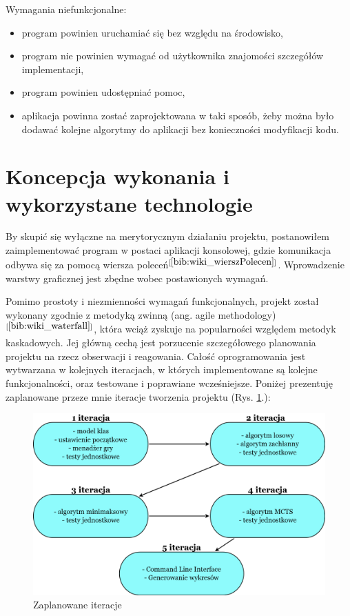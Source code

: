 Wymagania niefunkcjonalne:
\begin{itemize}
	\item program powinien uruchamiać się bez względu na środowisko,
	\item program nie powinien wymagać od użytkownika znajomości szczegółów implementacji,
	\item program powinien udostępniać pomoc,
	\item aplikacja powinna zostać zaprojektowana w taki sposób, żeby można było dodawać kolejne algorytmy do aplikacji bez konieczności modyfikacji kodu.
\end{itemize}
\clearpage
	
\section{Koncepcja wykonania i wykorzystane technologie}
By skupić się wyłączne na merytorycznym działaniu projektu, postanowiłem zaimplementować program w postaci aplikacji konsolowej, gdzie komunikacja odbywa się za pomocą wiersza poleceń$^{[\ref{bib:wiki_wierszPolecen}]}$. Wprowadzenie warstwy graficznej jest zbędne wobec postawionych wymagań.

Pomimo prostoty i niezmienności wymagań funkcjonalnych, projekt został wykonany zgodnie z metodyką zwinną (ang. agile methodology)$^{[\ref{bib:wiki_waterfall}]}$, która wciąż zyskuje na popularności względem metodyk kaskadowych. Jej główną cechą jest porzucenie szczegółowego planowania projektu na rzecz obserwacji i reagowania. Całość oprogramowania jest wytwarzana w kolejnych iteracjach, w których implementowane są kolejne funkcjonalności, oraz testowane i poprawiane wcześniejsze. Poniżej prezentuję zaplanowane przeze mnie iteracje tworzenia projektu (Rys. \ref{fig:diagramIteracji}.):

\begin{figure}[H]
	\centering
	\includegraphics[width=\textwidth]{Resources/DiagramIteracji.png}
	\caption{Zaplanowane iteracje} 
	\label{fig:diagramIteracji}
\end{figure}

